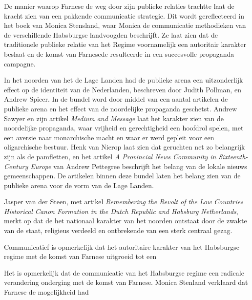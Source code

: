 \documentclass[11pt]{amsart}
\begin{document}
De manier waarop Farnese de weg door zijn publieke relaties trachtte laat de kracht zien van een pakkende communicatie
strategie. Dit wordt gereflecteerd in het boek van Monica Stensland, waar Monica de communicatie methodieken van de
verschillende Habsburgse landvoogden beschrijft. Ze laat zien dat de traditionele publieke relatie van het Regime
voornamelijk een autoritair karakter beslaat en de komst van Farnesede resulteerde in een succesvolle propaganda
campagne\autocite{stenslandHabsburgCommunicationDutch2012}.

In het noorden van het de Lage Landen had de publieke arena een uitzonderlijk effect op de identiteit van de
Nederlanden, beschreven door Judith Pollman, en Andrew Spicer\autocite{pollmannPublicOpinionChanging2007}. In de bundel
word door middel van een aantal artikelen de publieke arena en het effect van de noordelijke propaganda geschetst.
Andrew Sawyer en zijn artikel \textit{Medium and Message} laat het karakter zien van de noordelijke propaganda, waar
vrijheid en gerechtigheid een hoofdrol spelen, met een aversie naar monarchische macht en waar er werd gepleit voor een
oligarchische bestuur. Henk van Nierop\autocite{vannieropYeShallHear2007} laat zien dat geruchten net zo belangrijk
zijn als de pamfletten, en het artikel \textit{A Provincial News Community in Sixteenth-Century Europe} van Andrew
Pettegree\autocite{pettegreeProvincialNewsCommunity2007} beschrijft het belang van de lokale nieuws gemeenschappen. De
artikelen binnen deze bundel laten het belang zien van de publieke arena voor de vorm van de Lage Landen.

Jasper van der Steen, met artikel \textit{Remembering the Revolt of the Low Countries Historical Canon Formation in the
     Dutch Republic and Habsburg Netherlands}\autocite{vandersteenRememberingRevoltLow2018}, merkt op dat de het nationaal
karakter van het noorden ontstaat door de zwakte van de staat, religieus verdeeld en ontbrekende van een sterk centraal
gezag.

Communicatief is opmerkelijk dat het autoritaire karakter van het Habsburgse regime met de komst van Farnese uitgroeid
tot een

Het is opmerkelijk dat de communicatie van het Habsburgse regime een radicale verandering onderging met de komst van
Farnese. Monica Stenland verklaard dat Farnese de mogelijkheid had
\end{document}

